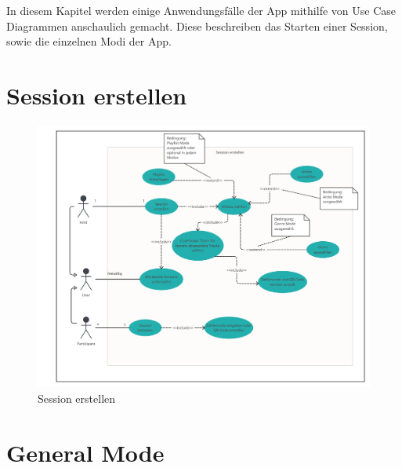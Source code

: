 \documentclass[oneside, ngerman]{sdqtechreport}
\begin{document}
In diesem Kapitel werden einige Anwendungsfälle der App mithilfe von Use Case Diagrammen anschaulich gemacht. Diese beschreiben das Starten einer Session, sowie die einzelnen Modi der App.

\section{Session erstellen}
\label{sec:Anwendungsfälle:Session erstellen}

\begin{figure}[h]
   \hypertarget{Anwendungsfaelle}{}
    \includegraphics[width = 16cm]{LATEX/Pflichtenheft/GraphicDesigns/Use Case Session erstellen.png}
    \caption{Session erstellen}
    \label{fig:Use Case App Start}
\end{figure}

\newpage

\section{General Mode}
\label{sec:Anwendungsfälle:General Mode}
\end{document}
